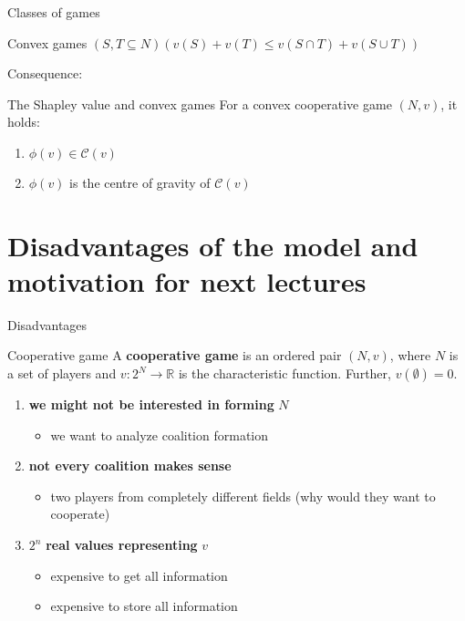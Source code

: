 \documentclass{beamer}
\begin{document}
\begin{frame}{Classes of games}
    \begin{block}{Convex games}
		$\left(S,T \subseteq N\right)\left(v(S)+v(T) \leq v\left(S \cap T\right)+v\left(S \cup T\right)\right)$
	\end{block}
	Consequence:
	\begin{block}{The Shapley value and  convex games}
		\pause
		For a convex cooperative game $(N,v)$, it holds:
		\begin{enumerate}
			\item $\phi(v) \in \mathcal{C}(v)$
			\item $\phi(v)$ is the centre of gravity of $\mathcal{C}(v)$
		\end{enumerate}
	\end{block}
\end{frame}


\section{Disadvantages of the model and motivation for next lectures}


\begin{frame}{Disadvantages}
    \begin{block}{Cooperative game}
        A \textbf{cooperative game} is an ordered pair $(N,v)$, where $N$ is a set of players and $v\colon 2^N \to \mathbb{R}$ is the characteristic function. Further, $v(\emptyset) = 0$.
    \end{block}
	\begin{enumerate}
		\item<2-> \textbf{we might not be interested in forming} $N$
		\begin{itemize}
			\item<3-> we want to analyze coalition formation
		\end{itemize}
		\item<4-> \textbf{not every coalition makes sense}
		\begin{itemize}
			\item<5-> two players from completely different fields (why would they want to cooperate)
		\end{itemize}
		\item<6-> $2^n$ \textbf{real values representing} $v$
		\begin{itemize}
			\item<7-> expensive to get all information
			\item<7-> expensive to store all information
		\end{itemize}
	\end{enumerate}
\end{frame}
\end{document}
